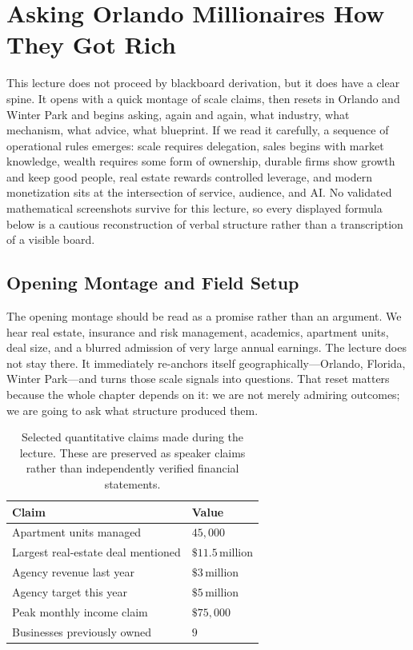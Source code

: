 \chapter{Asking Orlando Millionaires How They Got Rich}

This lecture does not proceed by blackboard derivation, but it does have a clear spine. It opens with a quick montage of scale claims, then resets in Orlando and Winter Park and begins asking, again and again, what industry, what mechanism, what advice, what blueprint. If we read it carefully, a sequence of operational rules emerges: scale requires delegation, sales begins with market knowledge, wealth requires some form of ownership, durable firms show growth and keep good people, real estate rewards controlled leverage, and modern monetization sits at the intersection of service, audience, and AI. No validated mathematical screenshots survive for this lecture, so every displayed formula below is a cautious reconstruction of verbal structure rather than a transcription of a visible board.

\section{Opening Montage and Field Setup}

The opening montage should be read as a promise rather than an argument. We hear real estate, insurance and risk management, academics, apartment units, deal size, and a blurred admission of very large annual earnings. The lecture does not stay there. It immediately re-anchors itself geographically---Orlando, Florida, Winter Park---and turns those scale signals into questions. That reset matters because the whole chapter depends on it: we are not merely admiring outcomes; we are going to ask what structure produced them.

\begin{table}[h]
\centering
\begin{tabular}{|l|l|}
\hline
Claim & Value \\
\hline
Apartment units managed & \(45{,}000\) \\
Largest real-estate deal mentioned & \(\$11.5\,\text{million}\) \\
Agency revenue last year & \(\$3\,\text{million}\) \\
Agency target this year & \(\$5\,\text{million}\) \\
Peak monthly income claim & \(\$75{,}000\) \\
Businesses previously owned & \(9\) \\
\hline
\end{tabular}
\caption{Selected quantitative claims made during the lecture. These are preserved as speaker claims rather than independently verified financial statements.}
\end{table}

